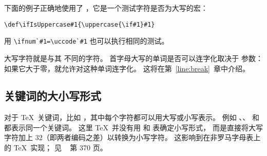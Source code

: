 \documentclass{book}
\begin{document}
下面的例子正确地使用了 ，它是一个测试字符是否为大写的宏：
\begin{verbatim}
\def\ifIsUppercase#1{\uppercase{\if#1}#1}
\end{verbatim}
用 \verb>\ifnum`#1=\uccode`#1> 也可以执行相同的测试。

大写字符就是与其  不同的字符。
首字母大写的单词是否可以连字化取决于  参数：
如果它大于零，就允许对这种单词连字化。
这将在第~\ref{line:break}~章中介绍。

\subsection{关键词的大小写形式}

对于 \TeX\ 关键词，比如 ，其中每个字符都可以用大写或小写表示。
例如  、、 和  都表示同一个关键词。
这里 \TeX\ 并没有用  和  表确定小写形式，
而是直接将大写字符加上 32（即两者编码之差）以转换为小写字符。
这影响到在非罗马字母表上的 \TeX\ 实现；
见 \TeXbook\ \cite{Knuth:TeXbook} 第 370 页。
\end{document}
